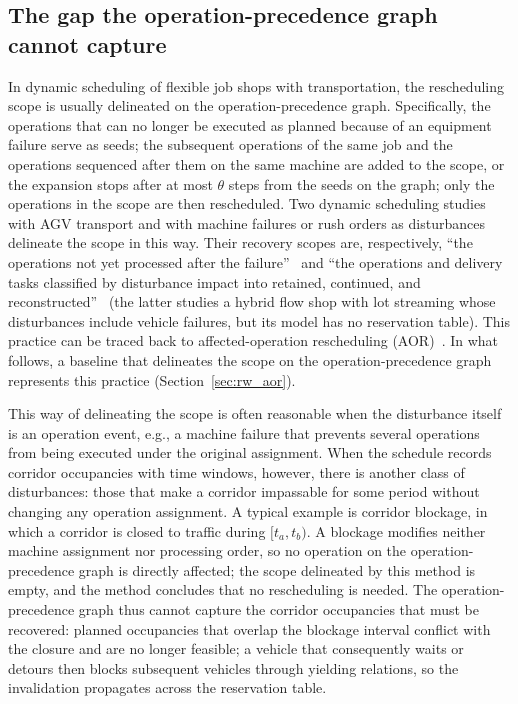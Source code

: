 \documentclass[manuscript,screen,review]{acmart}
\begin{document}
\subsection{The gap the operation-precedence graph cannot capture}

In dynamic scheduling of flexible job shops with transportation, the rescheduling scope is usually delineated on the operation-precedence graph.
Specifically, the operations that can no longer be executed as planned because of an equipment failure serve as seeds; the subsequent operations of the same job and the operations sequenced after them on the same machine are added to the scope,
or the expansion stops after at most \(\theta\) steps from the seeds on the graph; only the operations in the scope are then rescheduled.
Two dynamic scheduling studies with AGV transport and with machine failures or rush orders as disturbances delineate the scope in this way. Their recovery scopes are, respectively, ``the operations not yet processed after the failure''~\cite{zhang2023energy}
and ``the operations and delivery tasks classified by disturbance impact into retained, continued, and reconstructed''~\cite{tang2026dynamic} (the latter studies a hybrid flow shop with lot streaming whose disturbances include vehicle failures, but its model has no reservation table).
This practice can be traced back to affected-operation rescheduling (AOR)~\cite{zhang2023energy,tang2026dynamic}.
In what follows, a baseline that delineates the scope on the operation-precedence graph represents this practice (Section~\ref{sec:rw_aor}).

This way of delineating the scope is often reasonable when the disturbance itself is an operation event, e.g., a machine failure that prevents several operations from being executed under the original assignment.
When the schedule records corridor occupancies with time windows, however, there is another class of disturbances: those that make a corridor impassable for some period without changing any operation assignment. A typical example is corridor blockage,
in which a corridor is closed to traffic during \([t_a,t_b)\). A blockage modifies neither machine assignment nor processing order, so no operation on the operation-precedence graph is directly affected; the scope delineated by this method is empty, and the method concludes that no rescheduling is needed.
The operation-precedence graph thus cannot capture the corridor occupancies that must be recovered: planned occupancies that overlap the blockage interval conflict with the closure and are no longer feasible; a vehicle that consequently waits or detours then blocks subsequent vehicles through yielding relations, so the invalidation propagates across the reservation table.
\end{document}
